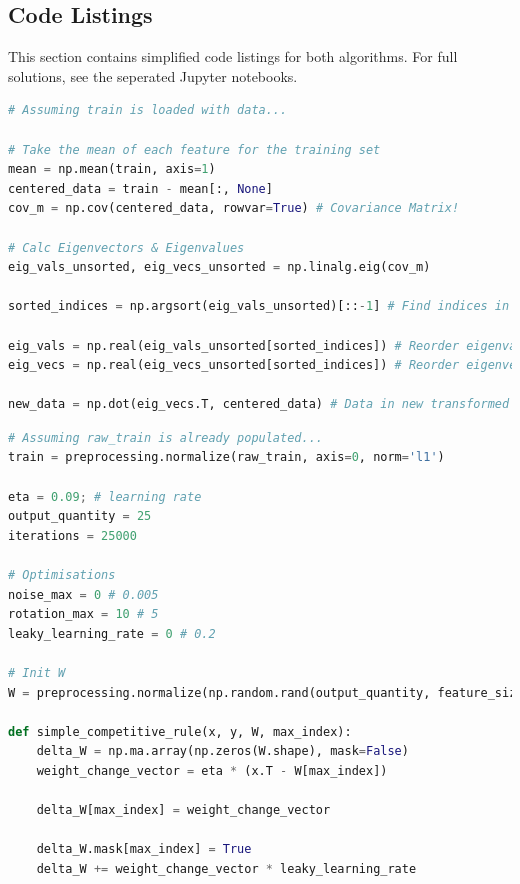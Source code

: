 \documentclass[11pt,journal,transmag,final]{IEEEtran}
\begin{document}
\onecolumn
    \begin{appendices}
        \section{Code Listings}

        This section contains simplified code listings for both algorithms. For full solutions, see the seperated Jupyter notebooks.

        \begin{lstlisting}[language=Python, caption=Principal Component Analysis Code, basicstyle=\footnotesize, label=code:pca]
# Assuming train is loaded with data...

# Take the mean of each feature for the training set
mean = np.mean(train, axis=1)
centered_data = train - mean[:, None]
cov_m = np.cov(centered_data, rowvar=True) # Covariance Matrix!

# Calc Eigenvectors & Eigenvalues
eig_vals_unsorted, eig_vecs_unsorted = np.linalg.eig(cov_m)

sorted_indices = np.argsort(eig_vals_unsorted)[::-1] # Find indices in dec order

eig_vals = np.real(eig_vals_unsorted[sorted_indices]) # Reorder eigenvalues
eig_vecs = np.real(eig_vecs_unsorted[sorted_indices]) # Reorder eigenvectors
    
new_data = np.dot(eig_vecs.T, centered_data) # Data in new transformed space
        \end{lstlisting}

        \begin{lstlisting}[language=Python, caption=Competitive Learning Code, basicstyle=\footnotesize, label=code:nn]
# Assuming raw_train is already populated...
train = preprocessing.normalize(raw_train, axis=0, norm='l1')

eta = 0.09; # learning rate
output_quantity = 25
iterations = 25000

# Optimisations
noise_max = 0 # 0.005
rotation_max = 10 # 5
leaky_learning_rate = 0 # 0.2

# Init W
W = preprocessing.normalize(np.random.rand(output_quantity, feature_size), axis=0, norm='l1')

def simple_competitive_rule(x, y, W, max_index):
    delta_W = np.ma.array(np.zeros(W.shape), mask=False)
    weight_change_vector = eta * (x.T - W[max_index])
    
    delta_W[max_index] = weight_change_vector
    
    delta_W.mask[max_index] = True
    delta_W += weight_change_vector * leaky_learning_rate
    

\end{lstlisting}
\end{appendices}
\end{document}
